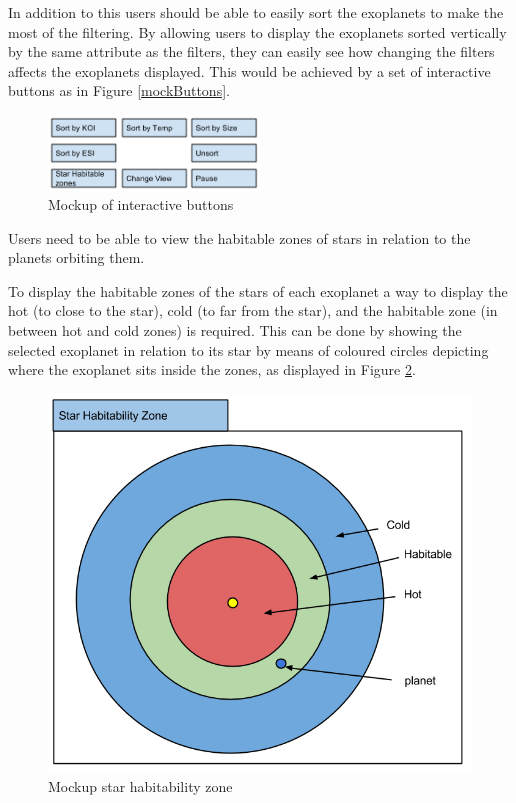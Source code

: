 \begin{enumerate}
In addition to this users should be able to easily sort the exoplanets to make
the most of the filtering. By allowing users to display the exoplanets sorted
vertically by the same attribute as the filters, they can easily see how
changing the filters affects the exoplanets displayed. This would be achieved by a set of interactive buttons as in Figure \ref{mockButtons}.

\begin{figure}[H]
  \centering
      \includegraphics[width=0.5\textwidth]{images/mockButtons.png}
  \caption{Mockup of interactive buttons}  
  \label{fig:mockButtons}
\end{figure}

\clearpage
{\bf
 \item[R5.] Users need to be able to view the habitable zones of stars in
relation to the planets orbiting them.}

To display the habitable zones of the stars of each exoplanet a way to display
the hot (to close to the star), cold (to far from the star), and the habitable
zone (in between hot and cold zones) is required. This can be done by showing
the selected exoplanet in relation to its star by means of coloured circles
depicting where the exoplanet sits inside the zones, as displayed in Figure
\ref{fig:hab}. 

\begin{figure}[H]
  \centering
      \includegraphics[width=.5\textwidth]{images/mockStarHabitability.png}
  \caption{Mockup star habitability zone}  
  \label{fig:hab}
\end{figure}




\end{enumerate}
\clearpage
